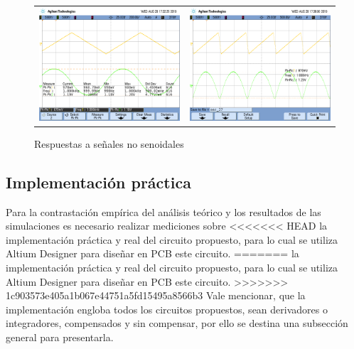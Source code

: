 \begin{figure}[H]
\begin{tabular}{c c}
		\includegraphics[scale=0.2]{Integrador/Mediciones/Osciloscopio/PCB_Compensado/osc_23.png} &
		\includegraphics[scale=0.2]{Integrador/Mediciones/Osciloscopio/PCB_Compensado/osc_27.png}
	\end{tabular}
	\caption{Respuestas a se\~nales no senoidales}
	\label{fig:respuestas_integrador_compensado}
\end{figure}

\subsection{Implementaci\'on pr\'actica}
Para la contrastaci\'on emp\'irica del an\'alisis te\'orico y los resultados de las simulaciones es necesario realizar mediciones sobre
<<<<<<< HEAD
la implementaci\'on pr\'actica y real del circuito propuesto, para lo cual se utiliza Altium Designer para dise\~nar en PCB este circuito.
=======
la implementaci\'on pr\'actica y real del circuito propuesto, para lo cual se utiliza Altium Designer para diseñar en PCB este circuito.
>>>>>>> 1c903573e405a1b067e44751a5fd15495a8566b3
Vale mencionar, que la implementaci\'on engloba todos los circuitos propuestos, sean derivadores o integradores, compensados y sin compensar, por ello
se destina una subsecci\'on general para presentarla.

